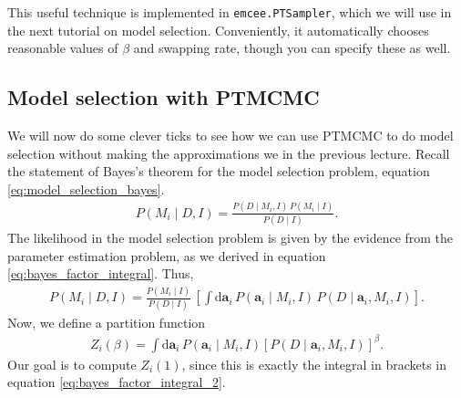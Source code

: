 This useful technique is implemented in \texttt{emcee.PTSampler}, which
we will use in the next tutorial on model selection.  Conveniently, it automatically
chooses reasonable values of $\beta$ and swapping rate, though you can
specify these as well.


\subsection{Model selection with PTMCMC}
We will now do some clever ticks to see how we can use PTMCMC to do
model selection without making the approximations we in the previous lecture.
Recall the statement of Bayes's theorem for the model selection
problem, equation \eqref{eq:model_selection_bayes}.
\begin{align}
P(M_i\mid D, I) = \frac{P(D\mid M_i, I)\,P(M_i\mid I)}{P(D\mid I)}.
\end{align}
The likelihood in the model selection problem is given by the evidence from the parameter estimation
problem, as we derived in equation \eqref{eq:bayes_factor_integral}. Thus,
\begin{align}
P(M_i\mid D, I) = \frac{P(M_i\mid I)}{P(D\mid I)} \,
\left[\int \mathrm{d}\mathbf{a}_i\,P(\mathbf{a}_i\mid M_i, I)\,P(D\mid \mathbf{a}_i, M_i, I)\right].
\label{eq:bayes_factor_integral_2}
\end{align}
Now, we define a partition function
\begin{align}
Z_i(\beta) = \int \mathrm{d}\mathbf{a}_i\,P(\mathbf{a}_i\mid M_i, I)
\left[P(D\mid \mathbf{a}_i, M_i, I)\right]^\beta.
\end{align}
Our goal is to compute $Z_i(1)$, since this is exactly the integral in
brackets in equation \eqref{eq:bayes_factor_integral_2}.

